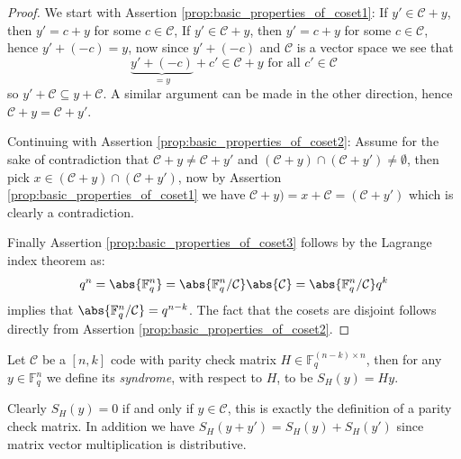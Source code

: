 \begin{proof}
  We start with Assertion \ref{prop:basic_properties_of_coset1}:
  If $y' \in \mathcal{C} + y$, then $y' = c + y$ for some $c \in \mathcal{C}$,
  If $y' \in \mathcal{C} + y$, then $y' = c + y$ for some $c \in \mathcal{C}$, hence $y' + (-c) = y$, now since $y' + (-c)$ and $\mathcal{C}$ is a vector space we see that
  \begin{equation*}
   \underset{=y}{\underbrace{y' + (-c)}} + c' \in \mathcal{C} + y \text{ for all } c' \in \mathcal{C}
  \end{equation*}
  so $y' + \mathcal{C} \subseteq y + \mathcal{C}$. A similar argument can be made in the other direction, hence $\mathcal{C} + y = \mathcal{C} + y'$.

  Continuing with Assertion \ref{prop:basic_properties_of_coset2}: Assume for the sake of contradiction that $\mathcal{C} + y \neq \mathcal{C} + y'$ and $(\mathcal{C} + y) \cap (\mathcal{C} + y') \neq \emptyset$, then pick $x \in (\mathcal{C} + y) \cap (\mathcal{C} + y')$, now by Assertion \ref{prop:basic_properties_of_coset1} we have $\mathcal{C} + y) = x + \mathcal{C} = (\mathcal{C} + y')$ which is clearly a contradiction.

  Finally Assertion \ref{prop:basic_properties_of_coset3} follows by the Lagrange index theorem as:
  \begin{equation*}
    q^{n} = \abs{\mathbb{F}_q^n} = \abs{\mathbb{F}_q^{n} / \mathcal{C}}\abs{\mathcal{C}} = \abs{\mathbb{F}_q^n / \mathcal{C}} q^{k}
  \end{equation*}
  implies that $\abs{\mathbb{F}_q^n / \mathcal{C}} = q^{n - k}$. The fact that the cosets are disjoint follows directly from Assertion \ref{prop:basic_properties_of_coset2}.
\end{proof}

\begin{definition}
  Let $\mathcal{C}$ be a $[n, k]$ code with parity check matrix $H \in \mathbb{F}_q^{(n - k) \times n}$, then for any  $y \in \mathbb{F}_q^n$ we define its \textit{syndrome}, with respect to $H$, to be $S_H(y) = H y$.
\end{definition}

\begin{remark}\label{rem:basic_properties}
  Clearly $S_H(y) = 0$ if and only if $y \in \mathcal{C}$, this is exactly the definition of a parity check matrix. In addition we have $S_H(y + y') = S_H(y) + S_H(y')$ since matrix vector multiplication is distributive.
\end{remark}

